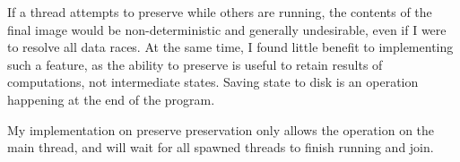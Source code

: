  If a thread attempts to preserve while others
are running, the contents of the final image would be non-deterministic and generally undesirable,
even if I were to resolve all data races. At the same time, I found little benefit to implementing such
a feature, as the ability to preserve is useful to retain results of computations, not intermediate states.
Saving state to disk is an operation happening at the end of the program.

My implementation on preserve preservation only allows the operation on the main thread, and will wait
for all spawned threads to finish running and join.